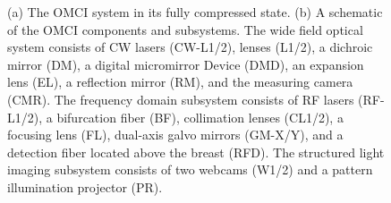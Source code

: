 \begin{figure}[]
    \begin{center}
    \end{center}
    \caption{(a) The \ac{OMCI} system in its fully compressed state. (b) A schematic of the \ac{OMCI} components and subsystems. The wide field optical system consists of \ac{CW} lasers (CW-L1/2), lenses (L1/2), a dichroic mirror (DM), a digital micromirror Device (DMD), an expansion lens (EL), a reflection mirror (RM), and the measuring camera (CMR). The frequency domain subsystem consists of RF lasers (RF-L1/2), a bifurcation fiber (BF), collimation lenses (CL1/2), a focusing lens (FL), dual-axis galvo mirrors (GM-X/Y), and a detection fiber located above the breast (RFD). The structured light imaging subsystem consists of two webcams (W1/2) and a pattern illumination projector (PR).} 
    \label{fig:OMCISystem}
\end{figure} 

